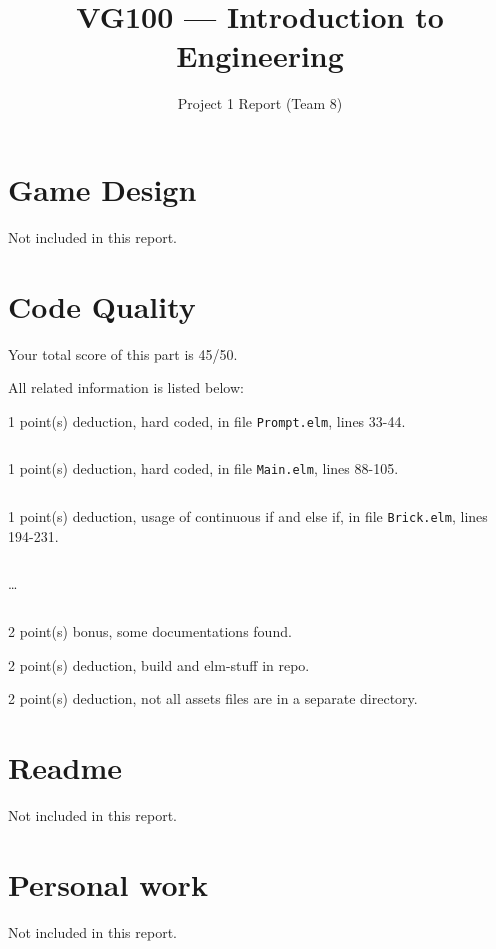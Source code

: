 \documentclass{article}
\title{VG100 --- Introduction to\\ Engineering}
\subtitle{Project 1 Report (Team 8)}
\begin{document}
\maketitle

\section{Game Design}

Not included in this report.

\section{Code Quality}

Your total score of this part is 45/50. \medskip

All related information is listed below: \medskip

1 point(s) {\color{red}deduction}, hard coded, in file {\color{blue}\texttt{Prompt.elm}}, lines {\color{blue}33-44}.

\inputminted[firstline=33,lastline=44]{elm}{Prompt.elm}

1 point(s) {\color{red}deduction}, hard coded, in file {\color{blue}\texttt{Main.elm}}, lines {\color{blue}88-105}.

\inputminted[firstline=88,lastline=105]{elm}{Main.elm}

1 point(s) {\color{red}deduction}, usage of continuous if and else if, in file {\color{blue}\texttt{Brick.elm}}, lines {\color{blue}194-231}.

\inputminted[firstline=194,lastline=203]{elm}{Brick.elm}

\dots

\inputminted[firstline=222,lastline=231]{elm}{Brick.elm}

2 point(s) {\color{red}bonus}, some documentations found.\medskip

2 point(s) {\color{red}deduction}, build and elm-stuff in repo.\medskip

2 point(s) {\color{red}deduction}, not all assets files are in a separate directory.\medskip



\newpage

\section{Readme}

Not included in this report.

\section{Personal work}

Not included in this report.


\newpage
\end{document}
